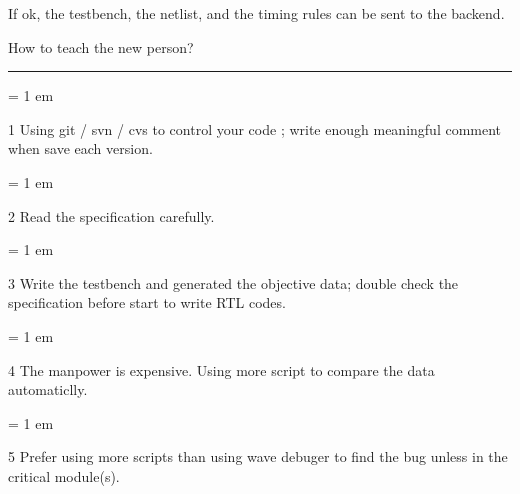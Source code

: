 If ok, the testbench, the netlist, and the timing rules can be sent to the backend.



{ \medbreak } { \FFcc
How to teach the new person?
} { \smallbreak } {\par\noindent\hrule} { \smallbreak }

{ \parindent = 1 em \item{1} 
Using git / svn / cvs to control your code ; write enough meaningful comment when save each version.
}
{ \parindent = 1 em \item{2} 
Read the specification carefully.
}
{ \parindent = 1 em \item{3} 
Write the testbench and generated the objective data; double check the specification before start to write RTL codes.
}
{ \parindent = 1 em \item{4} 
The manpower is expensive. Using more script to compare the data automaticlly. 
}
{ \parindent = 1 em \item{5} 
Prefer using more scripts than using wave debuger to find the bug 
unless in the critical module(s).
}

\bye
